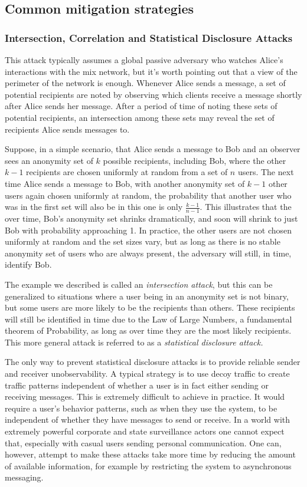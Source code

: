 \documentclass{article}
\begin{document}
\subsection{Common mitigation strategies}

\subsubsection{Intersection, Correlation and Statistical Disclosure Attacks }

This attack typically assumes a global passive adversary who watches Alice’s interactions with the mix network, but it's worth pointing out that a view of the perimeter of the network is enough. Whenever Alice sends a message, a set of potential recipients are noted by observing which clients receive a message shortly after Alice sends her message. After a period of time of noting these sets of potential recipients, an intersection among these sets may reveal the set of recipients Alice sends messages to.

Suppose, in a simple scenario, that Alice sends a message to Bob and an observer sees an anonymity set of $k$ possible recipients, including Bob, where the other $k-1$ recipients are chosen uniformly at random from a set of $n$ users. The next time Alice sends a message to Bob, with another anonymity set of $k-1$ other users again chosen uniformly at random, the probability that another user who was in the first set will also be in this one is only $\frac{k-1}{n-1}$.  This illustrates that the over time, Bob's anonymity set shrinks dramatically, and soon will shrink to just Bob with probability approaching 1. In practice, the other users are not chosen uniformly at random and the set sizes vary, but as long as there is no stable anonymity set of users who are always present, the adversary will still, in time, identify Bob. 

The example we described is called an \textit{intersection attack}, but this can be generalized to situations where a user being in an anonymity set is not binary, but some users are more likely to be the recipients than others. These recipients will still be identified in time due to the Law of Large Numbers, a fundamental theorem of Probability, as long as over time they are the most likely recipients. This more general attack is referred to as a \textit{statistical disclosure attack.}

The only way to prevent statistical disclosure attacks is to provide reliable sender and receiver unobservability. A typical strategy is to use decoy traffic to create traffic patterns independent of whether a user is in fact either sending or receiving messages. This is extremely difficult to achieve in practice. It would require a user's behavior patterns, such as when they use the system, to be independent of whether they have messages to send or receive. In a world with extremely powerful corporate and state surveillance actors one cannot expect that, especially with casual users sending personal communication. One can, however, attempt to make these attacks take more time by reducing the amount of available information, for example by restricting the system to asynchronous messaging.
\end{document}
